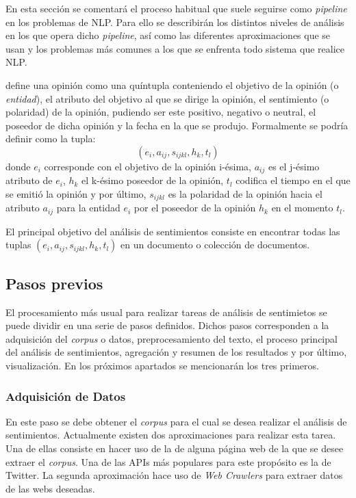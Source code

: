 En esta sección se comentará el proceso habitual que suele seguirse como
\emph{pipeline} en los problemas de \ac{NLP}. Para ello se describirán los
distintos niveles de análisis en los que opera dicho \emph{pipeline}, así como
las diferentes aproximaciones que se usan y los problemas más comunes a los que
se enfrenta todo sistema que realice \ac{NLP}.

\citet{liu:2010} define una opinión como una quíntupla conteniendo el objetivo
de la opinión (o \emph{entidad}), el atributo del objetivo al que se dirige la
opinión, el sentimiento (o polaridad) de la opinión, pudiendo ser este positivo,
negativo o neutral, el poseedor de dicha opinión y la fecha en la que se
produjo. Formalmente se podría definir como la tupla:
\[
  (e_i, a_{ij}, s_{ijkl}, h_k, t_l)
\]
donde $e_i$ corresponde con el objetivo de la opinión i-ésima, $a_{ij}$ es el
j-ésimo atributo de $e_i$, $h_k$ el k-ésimo poseedor de la opinión, $t_l$
codifica el tiempo en el que se emitió la opinión y por último, $s_{ijkl}$ es la
polaridad de la opinión hacia el atributo $a_{ij}$ para la entidad $e_i$ por el
poseedor de la opinión $h_k$ en el momento $t_l$.

El principal objetivo del análisis de sentimientos consiste en encontrar todas
las tuplas $(e_i, a_{ij}, s_{ijkl}, h_k, t_l)$ en un documento o colección de
documentos.

\subsection{Pasos previos}
\label{subsec:previousSteps}

El procesamiento más usual para realizar tareas de análisis de sentimietos se
puede dividir en una serie de pasos definidos. Dichos pasos corresponden a la
adquisición del \emph{corpus} o datos, preprocesamiento del texto, el proceso
principal del análisis de sentimientos, agregación y resumen de los resultados y
por último, visualización. En los próximos apartados se mencionarán los tres
primeros.

\subsubsection{Adquisición de Datos}
\label{sec:dataacq}

En este paso se debe obtener el \emph{corpus} para el cual se desea realizar el
análisis de sentimientos. Actualmente existen dos aproximaciones para realizar
esta tarea. Una de ellas consiste en hacer uso de la  de
alguna página web de la que se desee extraer el \emph{corpus}. Una de las
\acp{API} más populares para este propósito es la de Twitter. La segunda
aproximación hace uso de \emph{Web Crawlers} para
extraer datos de las webs deseadas.

